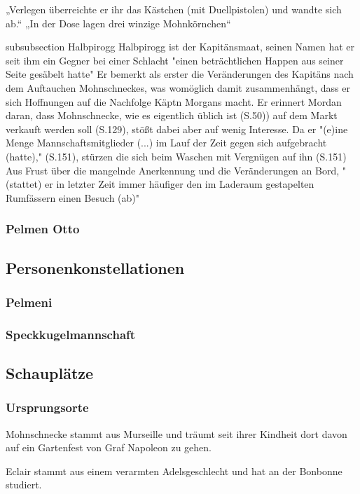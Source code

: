 „Verlegen überreichte er ihr das Kästchen (mit Duellpistolen) und wandte sich ab.“
„In der Dose lagen drei winzige Mohnkörnchen“

subsubsection Halbpirogg
Halbpirogg ist der Kapitänsmaat, seinen Namen hat er seit ihm ein Gegner bei einer Schlacht "einen beträchtlichen Happen aus seiner Seite gesäbelt hatte" \cite[S.33]{pir}
Er bemerkt als erster die Veränderungen des Kapitäns nach dem Auftauchen Mohnschneckes, was womöglich damit zusammenhängt, dass er sich Hoffnungen auf die Nachfolge Käptn Morgans macht.
Er erinnert Mordan daran, dass Mohnschnecke, wie es eigentlich üblich ist (S.50)) auf dem Markt verkauft werden soll (S.129), stößt dabei aber auf wenig Interesse. Da er "(e)ine Menge Mannschaftsmitglieder  (...) im Lauf der Zeit gegen sich aufgebracht (hatte)," (S.151), stürzen die sich beim Waschen mit Vergnügen auf ihn (S.151)
Aus Frust über die mangelnde Anerkennung und die Veränderungen an Bord, "(stattet) er in letzter Zeit immer häufiger den im Laderaum gestapelten Rumfässern einen Besuch (ab)" \cite[S. 181]{pir}

\subsubsection{Pelmen Otto}


\subsection {Personenkonstellationen}
\subsubsection {Pelmeni}
\subsubsection{Speckkugelmannschaft}

\subsection{Schauplätze}
\subsubsection{Ursprungsorte}
Mohnschnecke stammt aus Murseille und träumt seit ihrer Kindheit dort davon auf ein Gartenfest von Graf Napoleon zu gehen.

Eclair stammt aus einem verarmten Adelsgeschlecht und hat an der Bonbonne studiert.

